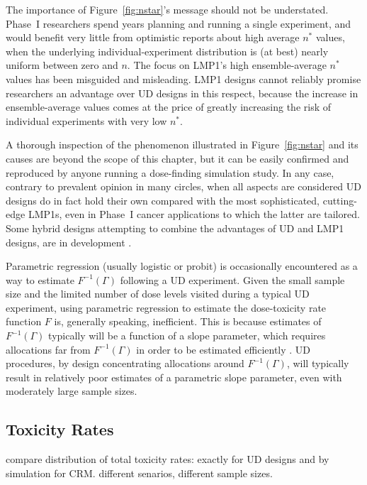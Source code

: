 The importance of Figure~\ref{fig:nstar}'s message  should not be understated.  Phase~I researchers spend years planning and running a single experiment, and would benefit very little from optimistic reports about high average $n^*$ values, when the underlying individual-experiment distribution is (at best) nearly uniform between zero and $n$. The focus on LMP1's high ensemble-average $n^*$ values has been misguided and misleading. LMP1 designs cannot reliably promise researchers an advantage over UD designs in this respect, because the increase in ensemble-average values comes at the price of greatly increasing the risk of individual experiments with very low $n^*$.

A thorough inspection of the phenomenon illustrated in Figure~\ref{fig:nstar} and its causes are beyond the scope of this chapter, but it can be easily confirmed and reproduced by anyone running a dose-finding simulation study. In any case, contrary to prevalent opinion in many circles, when all aspects are considered UD designs do in fact hold their own compared with the most sophisticated, cutting-edge LMP1s, even in  Phase~I cancer applications to which the latter are tailored. Some hybrid designs attempting to combine the advantages of UD and LMP1 designs, are in development \citep[Ch.~5]{Oron07}.

Parametric regression (usually logistic or probit) is occasionally encountered as a way to estimate $F^{-1}(\Gamma)$ following a UD experiment. Given the small sample size and the limited number of dose levels visited during a typical UD experiment, using parametric regression to estimate the dose-toxicity rate function $F$ is, generally speaking, inefficient.  This is because estimates of $F^{-1}(\Gamma)$ typically will be a function of a slope parameter, which requires allocations far from $F^{-1}(\Gamma)$ in order to be estimated efficiently \citep{Ford:Tors:Wu:use:1992}.  UD procedures, by design concentrating allocations around $F^{-1}(\Gamma)$, will typically result in relatively poor estimates  of a parametric slope parameter, even with moderately large sample sizes.

\subsection{Toxicity Rates}
compare distribution of total toxicity rates: exactly for UD designs and by simulation for CRM.  different senarios, different sample sizes.

